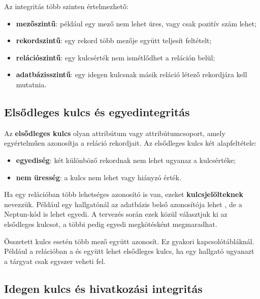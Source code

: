 Az integritás több szinten értelmezhető:

\begin{itemize}
  \item \textbf{mezőszintű}: például egy mező nem lehet üres, vagy csak pozitív szám lehet;
  \item \textbf{rekordszintű}: egy rekord több mezője együtt teljesít feltételt;
  \item \textbf{relációszintű}: egy kulcsérték nem ismétlődhet a reláción belül;
  \item \textbf{adatbázisszintű}: egy idegen kulcsnak másik reláció létező rekordjára kell mutatnia.
\end{itemize}

\begin{center}

\end{center}

\subsection{Elsődleges kulcs és egyedintegritás}

Az \textbf{elsődleges kulcs} olyan attribútum vagy attribútumcsoport, amely egyértelműen azonosítja a reláció rekordjait. Az elsődleges kulcs két alapfeltétele:

\begin{itemize}
  \item \textbf{egyediség}: két különböző rekordnak nem lehet ugyanaz a kulcsértéke;
  \item \textbf{nem üresség}: a kulcs nem lehet  vagy hiányzó érték.
\end{itemize}

Ha egy relációban több lehetséges azonosító is van, ezeket \textbf{kulcsjelölteknek} nevezzük. Például egy hallgatónál az adatbázis belső azonosítója lehet , de a Neptun-kód is lehet egyedi. A tervezés során ezek közül választjuk ki az elsődleges kulcsot, a többi pedig egyedi megkötésként megmaradhat.

Összetett kulcs esetén több mező együtt azonosít. Ez gyakori kapcsolótábláknál. Például a  relációban a  és  együtt lehet elsődleges kulcs, ha egy hallgató ugyanazt a tárgyat csak egyszer veheti fel.

\subsection{Idegen kulcs és hivatkozási integritás}

